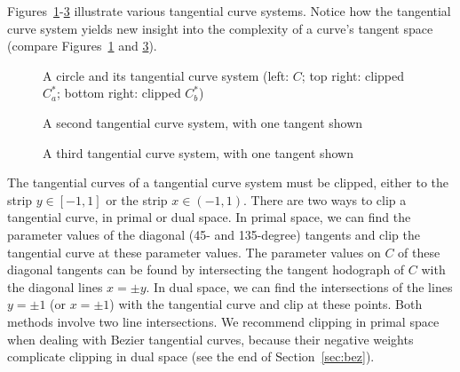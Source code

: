 \documentclass[12pt]{article}
\begin{document}

Figures~\ref{fig:tangcurve1}-\ref{fig:tangcurve3} illustrate various 
tangential curve systems.
Notice how the tangential curve system yields new insight into the complexity of a curve's
tangent space (compare Figures~\ref{fig:tangcurve1} and \ref{fig:tangcurve3}).

\begin{figure}
\centerline{}
\caption{A circle and its tangential curve system (left: $C$; top right: clipped $C^*_a$; bottom right: clipped $C^*_b$)}
\label{fig:tangcurve1}
\end{figure}

\begin{figure}
\centerline{}
\caption{A second tangential curve system, with one tangent shown}
\label{fig:tangcurve2}
\end{figure}

\begin{figure}
\centerline{}
\caption{A third tangential curve system, with one tangent shown}
\label{fig:tangcurve3}
\end{figure}


The tangential curves of a tangential curve system must be clipped,
either to the strip $y \in [-1,1]$ or the strip $x \in (-1,1)$.
There are two ways to clip a tangential curve, in primal or dual space.
In primal space, we can find the parameter values of the diagonal 
(45- and 135-degree) tangents and clip the tangential curve at these parameter values.
The parameter values on $C$ of these diagonal tangents can be found by intersecting
the tangent hodograph of $C$ with the diagonal lines $x = \pm y$.
In dual space, we can find the intersections of the lines $y=\pm 1$ (or $x=\pm 1$)
with the tangential curve and clip at these points.
Both methods involve two line intersections.
We recommend clipping in primal space when dealing with Bezier tangential curves,
because their negative weights complicate clipping in dual space
(see the end of Section~\ref{sec:bez}).
\end{document}
